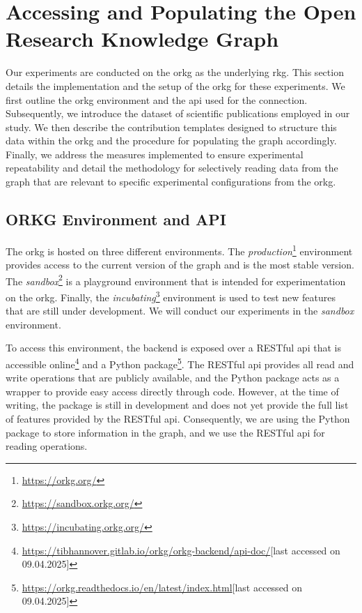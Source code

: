 
\section[Accessing and Populating the ORKG]{Accessing and Populating the Open Research Knowledge Graph}
\label{sec:implementation_orkg}

Our experiments are conducted on the \gls{orkg} as the underlying \gls{rkg}. This section details the implementation and the setup of the \gls{orkg} for these experiments. We first outline the \gls{orkg} environment and the \gls{api} used for the connection. Subsequently, we introduce the dataset of scientific publications employed in our study. We then describe the contribution templates designed to structure this data within the \gls{orkg} and the procedure for populating the graph accordingly. Finally, we address the measures implemented to ensure experimental repeatability and detail the methodology for selectively reading data from the graph that are relevant to specific experimental configurations from the \gls{orkg}.


\subsection{ORKG Environment and API}
\label{sec:orkg_environment_and_api}

The \gls{orkg} is hosted on three different environments. The \emph{production}\footnote{\url{https://orkg.org/}} environment provides access to the current version of the graph and is the most stable version. The \emph{sandbox}\footnote{\url{https://sandbox.orkg.org/}} is a playground environment that is intended for experimentation on the \gls{orkg}. Finally, the \emph{incubating}\footnote{\url{https://incubating.orkg.org/}} environment is used to test new features that are still under development. We will conduct our experiments in the \emph{sandbox} environment.

To access this environment, the backend is exposed over a RESTful \gls{api} that is accessible online\footnote{\url{https://tibhannover.gitlab.io/orkg/orkg-backend/api-doc/}[last accessed on 09.04.2025]} and a Python package\footnote{\url{https://orkg.readthedocs.io/en/latest/index.html}[last accessed on 09.04.2025]}. The RESTful \gls{api} provides all read and write operations that are publicly available, and the Python package acts as a wrapper to provide easy access directly through code. However, at the time of writing, the package is still in development and does not yet provide the full list of features provided by the RESTful \gls{api}. Consequently, we are using the Python package to store information in the graph, and we use the RESTful \gls{api} for reading operations.

